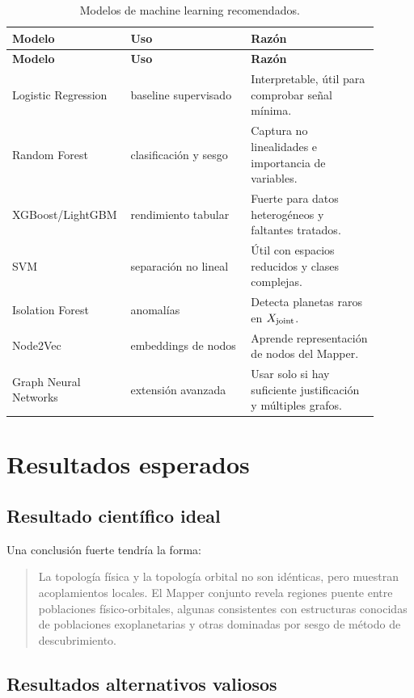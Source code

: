 \documentclass[11pt,letterpaper]{article}
\newcommand{\joint}{\rm joint}
\begin{document}
\begin{longtable}{p{0.24\linewidth}p{0.32\linewidth}p{0.34\linewidth}}
\caption{Modelos de machine learning recomendados.}\\
\toprule
\textbf{Modelo} & \textbf{Uso} & \textbf{Razón} \\
\midrule
\endfirsthead
\toprule
\textbf{Modelo} & \textbf{Uso} & \textbf{Razón} \\
\midrule
\endhead
Logistic Regression & baseline supervisado & Interpretable, útil para comprobar señal mínima. \\
Random Forest & clasificación y sesgo & Captura no linealidades e importancia de variables. \\
XGBoost/LightGBM & rendimiento tabular & Fuerte para datos heterogéneos y faltantes tratados. \\
SVM & separación no lineal & Útil con espacios reducidos y clases complejas. \\
Isolation Forest & anomalías & Detecta planetas raros en $X_{\joint}$. \\
Node2Vec & embeddings de nodos & Aprende representación de nodos del Mapper. \\
Graph Neural Networks & extensión avanzada & Usar solo si hay suficiente justificación y múltiples grafos. \\
\bottomrule
\end{longtable}

\section{Resultados esperados}

\subsection{Resultado científico ideal}

Una conclusión fuerte tendría la forma:

\begin{quote}
La topología física y la topología orbital no son idénticas, pero muestran acoplamientos locales. El Mapper conjunto revela regiones puente entre poblaciones físico-orbitales, algunas consistentes con estructuras conocidas de poblaciones exoplanetarias y otras dominadas por sesgo de método de descubrimiento.
\end{quote}

\subsection{Resultados alternativos valiosos}
\end{document}
